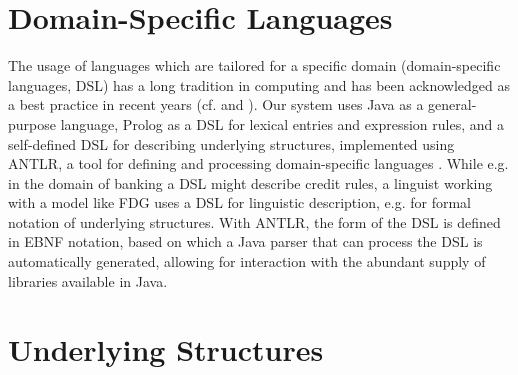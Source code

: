 \documentclass[a4paper, halfparskip, onecolumn, abstracton, final, figurecaptionabove]{scrartcl}
\begin{document}
\section{Domain-Specific Languages}\label{dsls}
The usage of languages which are tailored for a specific domain (domain-specific languages, DSL) has a long tradition in computing and has been acknowledged as a best practice in recent years (cf. \citealt[Ch. 12]{HuntAndThomas1999} and \citealt{Parr2007}). Our system uses Java as a general-purpose language, Prolog as a DSL for lexical entries and expression rules, and a self-defined DSL for describing underlying structures, implemented using ANTLR, a tool for defining and processing domain-specific languages \citep{Parr2007}. While e.g. in the domain of banking a DSL might describe credit rules, a linguist working with a model like FDG uses a DSL for linguistic description, e.g. for formal notation of underlying structures. With ANTLR, the form of the DSL is defined in EBNF notation, based on which a Java parser that can process the DSL is automatically generated, allowing for interaction with the abundant supply of libraries available in Java.


\begin{figure}
\begin{center}
\mbox{}
\end{center}
 \label{antlr-rl}
\end{figure}







\section{Underlying Structures}
\end{document}
